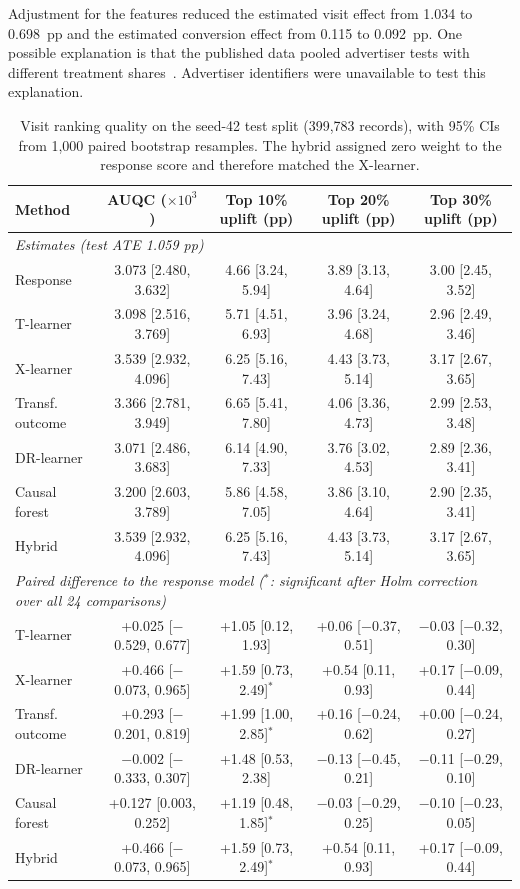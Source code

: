 \documentclass[conference]{IEEEtran}
\begin{document}
Adjustment for the features reduced the estimated visit effect from
1.034 to 0.698~pp and the estimated conversion effect from 0.115 to
0.092~pp. One possible explanation is that the published data pooled
advertiser tests with different treatment shares~\cite{diemert2021}.
Advertiser identifiers were unavailable to test this explanation.

\begin{table}[t]
  \centering
  \caption{Visit ranking quality on the seed-42 test split
           (399,783 records), with 95\% CIs from 1,000 paired bootstrap
           resamples. The hybrid assigned zero weight to the response
           score and therefore matched the X-learner.}
  \label{tab:main}
  \footnotesize
  \begin{tabular}{lcccc}
\toprule
Method & AUQC ($\times10^3$) & Top 10\% uplift (pp) & Top 20\% uplift (pp) & Top 30\% uplift (pp) \\
\midrule
\multicolumn{5}{l}{\textit{Estimates (test ATE 1.059 pp)}} \\
Response & 3.073 [2.480, 3.632] & 4.66 [3.24, 5.94] & 3.89 [3.13, 4.64] & 3.00 [2.45, 3.52] \\
T-learner & 3.098 [2.516, 3.769] & 5.71 [4.51, 6.93] & 3.96 [3.24, 4.68] & 2.96 [2.49, 3.46] \\
X-learner & 3.539 [2.932, 4.096] & 6.25 [5.16, 7.43] & 4.43 [3.73, 5.14] & 3.17 [2.67, 3.65] \\
Transf. outcome & 3.366 [2.781, 3.949] & 6.65 [5.41, 7.80] & 4.06 [3.36, 4.73] & 2.99 [2.53, 3.48] \\
DR-learner & 3.071 [2.486, 3.683] & 6.14 [4.90, 7.33] & 3.76 [3.02, 4.53] & 2.89 [2.36, 3.41] \\
Causal forest & 3.200 [2.603, 3.789] & 5.86 [4.58, 7.05] & 3.86 [3.10, 4.64] & 2.90 [2.35, 3.41] \\
Hybrid & 3.539 [2.932, 4.096] & 6.25 [5.16, 7.43] & 4.43 [3.73, 5.14] & 3.17 [2.67, 3.65] \\
\midrule
\multicolumn{5}{l}{\textit{Paired difference to the response model ($^{*}$: significant after Holm correction over all 24 comparisons)}} \\
T-learner & +0.025 [$-$0.529, 0.677] & +1.05 [0.12, 1.93] & +0.06 [$-$0.37, 0.51] & $-$0.03 [$-$0.32, 0.30] \\
X-learner & +0.466 [$-$0.073, 0.965] & +1.59 [0.73, 2.49]$^{*}$ & +0.54 [0.11, 0.93] & +0.17 [$-$0.09, 0.44] \\
Transf. outcome & +0.293 [$-$0.201, 0.819] & +1.99 [1.00, 2.85]$^{*}$ & +0.16 [$-$0.24, 0.62] & +0.00 [$-$0.24, 0.27] \\
DR-learner & $-$0.002 [$-$0.333, 0.307] & +1.48 [0.53, 2.38] & $-$0.13 [$-$0.45, 0.21] & $-$0.11 [$-$0.29, 0.10] \\
Causal forest & +0.127 [0.003, 0.252] & +1.19 [0.48, 1.85]$^{*}$ & $-$0.03 [$-$0.29, 0.25] & $-$0.10 [$-$0.23, 0.05] \\
Hybrid & +0.466 [$-$0.073, 0.965] & +1.59 [0.73, 2.49]$^{*}$ & +0.54 [0.11, 0.93] & +0.17 [$-$0.09, 0.44] \\
\bottomrule
\end{tabular}
\end{table}
\end{document}
